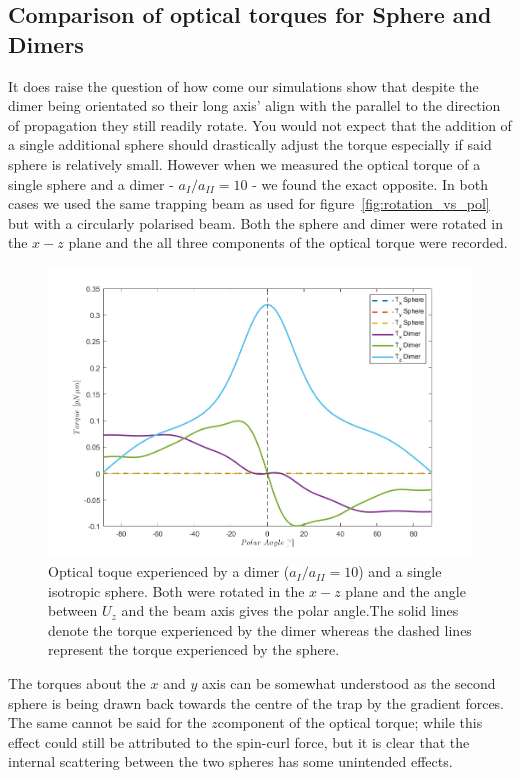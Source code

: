 \subsection{Comparison of optical torques for Sphere and Dimers}
It does raise the question of how come our simulations show that despite the 
dimer being orientated so their long axis' align with the parallel to the 
direction of propagation they still readily rotate. You would not expect that
the addition of a single additional sphere should drastically adjust the torque
especially if said sphere is relatively small. However when we measured the 
optical torque of a single sphere and a dimer - $a_{I}/a_{II}=10$ - we found 
the exact opposite. In both cases we used the same trapping beam as used for
figure~\ref{fig:rotation_vs_pol} but with a circularly polarised beam. Both 
the sphere and dimer were rotated in the $x-z$ plane and the all three components of the optical torque were recorded.
\begin{figure}[h!]
	\centering	
	\includegraphics[width=\linewidth]{sphere_dimer_torque.png}
	\caption{Optical toque experienced by a dimer ($a_{I}/a_{II}=10$) and a 
	single isotropic sphere. Both were rotated in the $x-z$ plane and the angle 
	between $U_z$ and the beam axis gives the polar angle.The solid lines denote 
	the torque experienced by the dimer whereas the dashed lines represent the 
	torque experienced by the sphere.}
	\label{fig:sphere_dimer_torque}
\end{figure}
 
The torques about the $x$ and $y$ axis can be somewhat understood as the second 
sphere is being drawn back towards the centre of the trap by the gradient forces. The same cannot be said for the $z$component of the optical torque; while this effect could still be attributed to the spin-curl force, but it is clear that the internal scattering between the two spheres has some unintended effects. 

